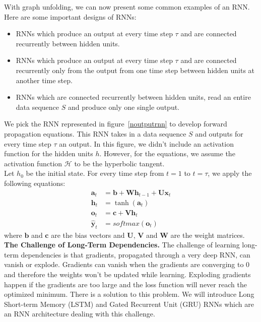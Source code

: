 
With graph unfolding, we can now present some common examples of an RNN. Here are
some important designs of RNNs:


\begin{itemize}
  \item RNNs which produce an output at every time step $\tau$ and are connected
    recurrently between hidden units.
  \item RNNs which produce an output at every time step $\tau$ and are connected
    recurrently only from the output from one time step between hidden units at
    another time step.
  \item RNNs which are connected recurrently between hidden units, read an
    entire data sequence $S$ and produce only one single output.
\end{itemize}



We pick the RNN represented in figure~\ref{noutputrnn} to develop forward
propagation equations. This RNN takes in a data sequence $S$ and outputs for
every time step $\tau$ an output. In this figure, we didn't include an
activation function for the hidden units $h$. However, for the equations, we
assume the activation function $\mathcal{H}$ to be the hyperbolic tangent.\\

Let $h_{0}$ be the initial state. For every time step from $t = 1$ to $t =
\tau$, we apply the following equations:
  \begin{align}
    \bm{a}_{t} & = \bm{b} + \bm{Wh}_{t-1} + \bm{Ux}_{t} \\
    \bm{h}_{t} & = \tanh(\bm{a}_{t}) \\
    \bm{o}_{t} & = \bm c + \bm{Vh}_{t} \\
    \bm{\hat y}_{t} & = softmax(\bm o_{t})
  \end{align}
where $\bm b$ and $\bm c$ are the bias vectors and $\bm U$, $\bm V$ and $\bm W$ are
the weight matrices.\\


\textbf{The Challenge of Long-Term Dependencies.} The challenge of learning
long-term dependencies is that gradients, propagated through a very deep RNN,
can vanish or explode. Gradients can vanish when the gradients are converging to
$0$ and therefore the weights won't be updated while learning. Exploding
gradients happen if the gradients are too large and the loss function will never
reach the optimized minimum. There is a solution to this problem. We will
introduce Long Short-term Memory (LSTM) and Gated Recurrent Unit (GRU) RNNs
which are an RNN architecture dealing with this
challenge.\cite{doi:10.1162/neco.1997.9.8.1735}
